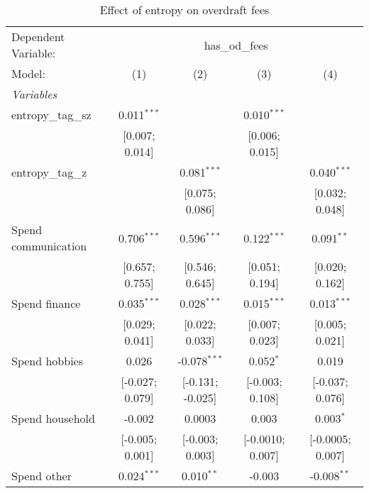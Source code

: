 
\begin{table}[htbp]
   \centering
   \scriptsize
   \begin{threeparttable}[b]
      \caption{\label{tab:reg_entropy_odfees} Effect of entropy on overdraft fees}
      \begin{tabular}{lcccc}
         \tabularnewline \midrule \midrule
         Dependent Variable: & \multicolumn{4}{c}{has\_od\_fees}\\
         Model:              & (1)              & (2)              & (3)                   & (4)\\  
         \midrule
         \emph{Variables}\\
         entropy\_tag\_sz    & 0.011$^{***}$    &                  & 0.010$^{***}$         &   \\   
                             & [0.007; 0.014]   &                  & [0.006; 0.015]        &   \\   
         entropy\_tag\_z     &                  & 0.081$^{***}$    &                       & 0.040$^{***}$\\   
                             &                  & [0.075; 0.086]   &                       & [0.032; 0.048]\\   
         Spend communication & 0.706$^{***}$    & 0.596$^{***}$    & 0.122$^{***}$         & 0.091$^{**}$\\   
                             & [0.657; 0.755]   & [0.546; 0.645]   & [0.051; 0.194]        & [0.020; 0.162]\\   
         Spend finance       & 0.035$^{***}$    & 0.028$^{***}$    & 0.015$^{***}$         & 0.013$^{***}$\\   
                             & [0.029; 0.041]   & [0.022; 0.033]   & [0.007; 0.023]        & [0.005; 0.021]\\   
         Spend hobbies       & 0.026            & -0.078$^{***}$   & 0.052$^{*}$           & 0.019\\   
                             & [-0.027; 0.079]  & [-0.131; -0.025] & [-0.003; 0.108]       & [-0.037; 0.076]\\   
         Spend household     & -0.002           & 0.0003           & 0.003                 & 0.003$^{*}$\\   
                             & [-0.005; 0.001]  & [-0.003; 0.003]  & [-0.0010; 0.007]      & [-0.0005; 0.007]\\   
         Spend other         & 0.024$^{***}$    & 0.010$^{**}$     & -0.003                & -0.008$^{**}$\\   

\end{tabular}
\end{threeparttable}
\end{table}

